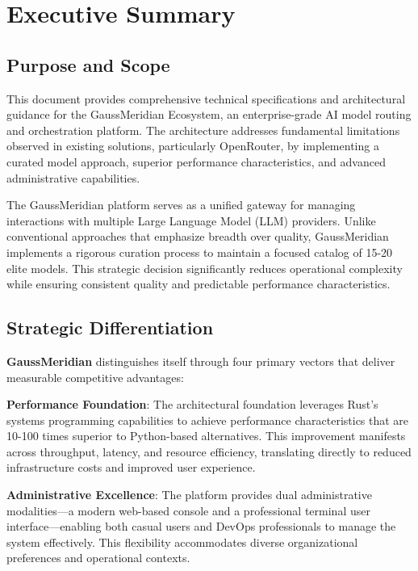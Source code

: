 \documentclass[12pt,a4paper,twoside]{report}
\newcommand{\gaussmeridian}{\textbf{GaussMeridian}}
\begin{document}

\chapter*{Executive Summary}

\section*{Purpose and Scope}

This document provides comprehensive technical specifications and architectural guidance for the GaussMeridian Ecosystem, an enterprise-grade AI model routing and orchestration platform. The architecture addresses fundamental limitations observed in existing solutions, particularly OpenRouter, by implementing a curated model approach, superior performance characteristics, and advanced administrative capabilities.

The GaussMeridian platform serves as a unified gateway for managing interactions with multiple Large Language Model (LLM) providers. Unlike conventional approaches that emphasize breadth over quality, GaussMeridian implements a rigorous curation process to maintain a focused catalog of 15-20 elite models. This strategic decision significantly reduces operational complexity while ensuring consistent quality and predictable performance characteristics.

\section*{Strategic Differentiation}

\gaussmeridian{} distinguishes itself through four primary vectors that deliver measurable competitive advantages:

\textbf{Performance Foundation}: The architectural foundation leverages Rust's systems programming capabilities to achieve performance characteristics that are 10-100 times superior to Python-based alternatives. This improvement manifests across throughput, latency, and resource efficiency, translating directly to reduced infrastructure costs and improved user experience.

\textbf{Administrative Excellence}: The platform provides dual administrative modalities—a modern web-based console and a professional terminal user interface—enabling both casual users and DevOps professionals to manage the system effectively. This flexibility accommodates diverse organizational preferences and operational contexts.
\end{document}

